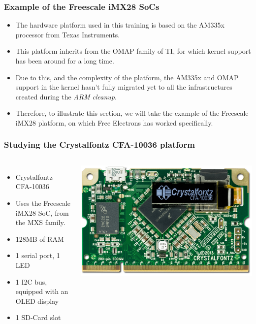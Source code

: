 \begin{frame}
  \frametitle{Example of the Freescale iMX28 SoCs}
  \begin{itemize}
  \item The hardware platform used in this training is based on the
    AM335x processor from Texas Instruments.
  \item This platform inherits from the OMAP family of TI, for which
    kernel support has been around for a long time.
  \item Due to this, and the complexity of the platform, the AM335x
    and OMAP support in the kernel hasn't fully migrated yet to all
    the infrastructures created during the {\em ARM cleanup}.
  \item Therefore, to illustrate this section, we will take the
    example of the Freescale iMX28 platform, on which Free Electrons
    has worked specifically.
  \end{itemize}
\end{frame}

\begin{frame}
  \frametitle{Studying the Crystalfontz CFA-10036 platform}
  \begin{columns}
    \begin{itemize}
    \item Crystalfontz CFA-10036
    \item Uses the Freescale iMX28 SoC, from the MXS family.
    \item 128MB of RAM
    \item 1 serial port, 1 LED
    \item 1 I2C bus, equipped with an OLED display
    \item 1 SD-Card slot
    \end{itemize}
    \includegraphics[width=\textwidth]{slides/kernel-porting-content/crystalfontz.jpg}
  \end{columns}
\end{frame}

